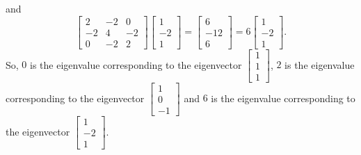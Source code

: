 \begin{solution}
\begin{enumerate}
\[\]
and
\[
\left[\begin{array}{ccc}2 & -2 & 0 \\ -2 & 4 & -2 \\ 0 & -2 & 2\end{array}\right]\left[\begin{array}{c}1 \\ -2 \\ 1\end{array}\right]=\left[\begin{array}{c}6 \\ -12 \\ 6\end{array}\right]=6\left[\begin{array}{c}1 \\ -2 \\ 1\end{array}\right].
\]
So, $0$ is the eigenvalue corresponding to the eigenvector $\left[\begin{array}{c}1 \\ 1 \\ 1\end{array}\right]$, $2$ is the eigenvalue corresponding to the eigenvector $\left[\begin{array}{c}1 \\ 0 \\ -1\end{array}\right]$ and $6$ is the eigenvalue corresponding to the eigenvector $\left[\begin{array}{c}1 \\ -2 \\ 1\end{array}\right]$.




\end{enumerate}
\end{solution}
